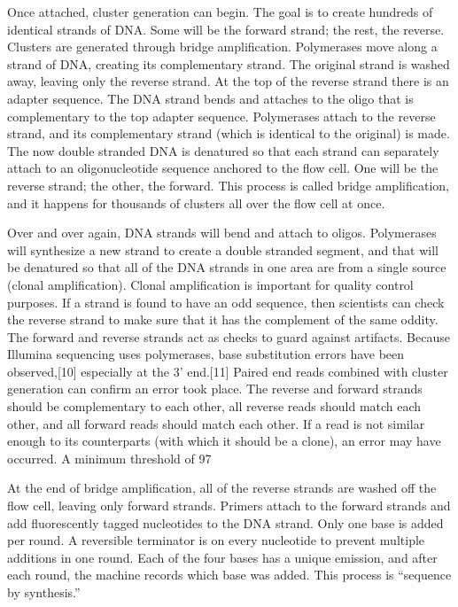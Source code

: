 Once attached, cluster generation can begin. The goal is to create hundreds of identical strands of DNA. Some will be the forward strand; the rest, the reverse. Clusters are generated through bridge amplification. Polymerases move along a strand of DNA, creating its complementary strand. The original strand is washed away, leaving only the reverse strand. At the top of the reverse strand there is an adapter sequence. The DNA strand bends and attaches to the oligo that is complementary to the top adapter sequence. Polymerases attach to the reverse strand, and its complementary strand (which is identical to the original) is made. The now double stranded DNA is denatured so that each strand can separately attach to an oligonucleotide sequence anchored to the flow cell. One will be the reverse strand; the other, the forward. This process is called bridge amplification, and it happens for thousands of clusters all over the flow cell at once.

Over and over again, DNA strands will bend and attach to oligos. Polymerases will synthesize a new strand to create a double stranded segment, and that will be denatured so that all of the DNA strands in one area are from a single source (clonal amplification). Clonal amplification is important for quality control purposes. If a strand is found to have an odd sequence, then scientists can check the reverse strand to make sure that it has the complement of the same oddity. The forward and reverse strands act as checks to guard against artifacts. Because Illumina sequencing uses polymerases, base substitution errors have been observed,[10] especially at the 3’ end.[11] Paired end reads combined with cluster generation can confirm an error took place. The reverse and forward strands should be complementary to each other, all reverse reads should match each other, and all forward reads should match each other. If a read is not similar enough to its counterparts (with which it should be a clone), an error may have occurred. A minimum threshold of 97%

At the end of bridge amplification, all of the reverse strands are washed off the flow cell, leaving only forward strands. Primers attach to the forward strands and add fluorescently tagged nucleotides to the DNA strand. Only one base is added per round. A reversible terminator is on every nucleotide to prevent multiple additions in one round. Each of the four bases has a unique emission, and after each round, the machine records which base was added. This process is “sequence by synthesis.”

